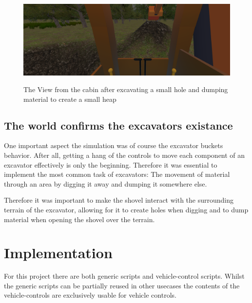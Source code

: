 \documentclass[journal]{vgtc}                     %
\begin{document}
\begin{figure}[tb]%
  \centering %
  \includegraphics[width=\columnwidth, alt={The view from the cabin of a excavator. On one side there is a smaller hole, next to it lies a small heap of material, suggesting the excavator dug it out. the shovel is placed neatly on top of the heap}]{GroundDeformation}
  \caption{%
  	The View from the cabin after excavating a small hole and dumping material to create a small heap%
  }
  \label{fig:cabin_view}
\end{figure}

\subsection{The world confirms the excavators existance}

One important aspect the simulation was of course the excavator buckets behavior. After all, getting a hang of the controls to move each component of an excavator effectively is only the beginning. Therefore it was essential to implement the most common task of excavators: The movement of material through an area by digging it away and dumping it somewhere else.

Therefore it was important to make the shovel interact with the surrounding terrain of the excavator, allowing for it to create holes when digging and to dump material when opening the shovel over the terrain.


\section{Implementation}
For this project there are both generic scripts and vehicle-control scripts. Whilst the generic scripts can be partially reused in other usecases the contents of the vehicle-controls are exclusively usable for vehicle controls.
\end{document}
